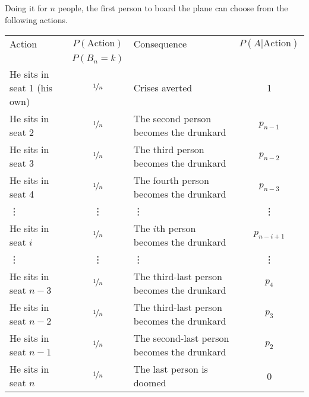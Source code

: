 \documentclass[a4paper]{article}
\begin{document}
Doing it for $n$ people, the first person to board the plane can choose from the following actions.
\begin{center}
\begin{tabular}{lclc}
\hline
 Action                    & $P(\text{Action})$ &  Consequence                             & $P(A|\text{Action})$ \\
                           & $P(B_n = k)$       &                                          &               \\
 \hline
He sits in seat 1 (his own)& $\nicefrac{1}{n}$  &  Crises averted                          & 1\\
He sits in seat 2          & $\nicefrac{1}{n}$  &  The second person becomes the drunkard  & $p_{n-1}$\\
He sits in seat 3          & $\nicefrac{1}{n}$  &  The third person becomes the drunkard   & $p_{n-2}$\\
He sits in seat 4          & $\nicefrac{1}{n}$  &  The fourth person becomes the drunkard  & $p_{n-3}$\\
\vdots                     &   \vdots           &   \vdots                                 & \vdots \\
He sits in seat $i$        & $\nicefrac{1}{n}$  &  The $i$th person becomes the drunkard   & $p_{n-i+1}$\\
\vdots                     &   \vdots           &   \vdots                                 & \vdots \\
He sits in seat $n-3$      & $\nicefrac{1}{n}$  &  The third-last person becomes the drunkard & $p_{4}$\\
He sits in seat $n-2$      & $\nicefrac{1}{n}$  &  The third-last person becomes the drunkard & $p_{3}$\\
He sits in seat $n-1$      & $\nicefrac{1}{n}$  &  The second-last person becomes the drunkard & $p_{2}$\\
He sits in seat $n  $      & $\nicefrac{1}{n}$  &  The last person is doomed               & 0\\
\hline
\end{tabular}
\end{center}
\end{document}
